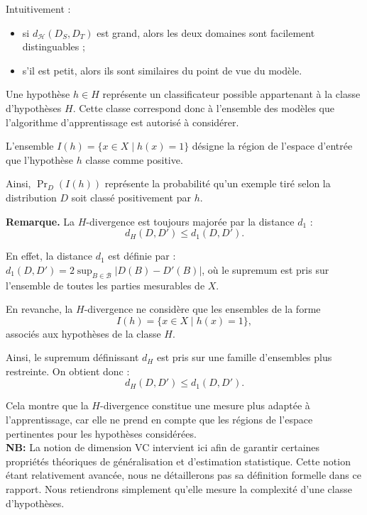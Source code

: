 \documentclass[a4paper,12pt]{article}
\theoremstyle{definition}
\theoremstyle{remark}
\begin{document}
Intuitivement :
\begin{itemize}
\item si $d_{\mathcal{H}}(D_S, D_T)$ est grand, alors les deux domaines sont facilement distinguables ;
\item s’il est petit, alors ils sont similaires du point de vue du modèle.\\
\end{itemize}



Une hypothèse $h \in H$ représente un classificateur possible appartenant à la classe
d’hypothèses $H$. Cette classe correspond donc à l’ensemble des modèles que l’algorithme
d’apprentissage est autorisé à considérer.

L’ensemble $I(h)=\{x \in X \mid h(x)=1\}$ désigne la région de l’espace d’entrée que l’hypothèse $h$ classe comme positive.

Ainsi, $\Pr_D(I(h))$ représente la probabilité qu’un exemple tiré selon la distribution $D$ soit classé positivement
par $h$.\\

\medskip

\textbf{Remarque.}
La $H$-divergence est toujours majorée par la distance $d_1$ :
\[
d_H(D,D')
\leq
d_1(D,D').
\]

En effet, la distance $d_1$ est définie par : $d_1(D,D') = 2\sup_{B\in\mathcal B}|D(B)-D'(B)|$,
où le supremum est pris sur l’ensemble de toutes les parties mesurables de $X$.

En revanche, la $H$-divergence ne considère que les ensembles de la forme
\[
I(h)=\{x\in X \mid h(x)=1\},
\]
associés aux hypothèses de la classe $H$.

Ainsi, le supremum définissant $d_H$ est pris sur une famille d’ensembles plus restreinte.
On obtient donc :
\[
d_H(D,D')
\leq
d_1(D,D').
\]

Cela montre que la $H$-divergence constitue une mesure plus adaptée à l’apprentissage,
car elle ne prend en compte que les régions de l’espace pertinentes pour les hypothèses
considérées.\\


\textbf{NB:} La notion de dimension VC intervient ici afin de garantir certaines propriétés théoriques
de généralisation et d’estimation statistique. Cette notion étant relativement avancée,
nous ne détaillerons pas sa définition formelle dans ce rapport. Nous retiendrons simplement
qu’elle mesure la complexité d’une classe d’hypothèses.\\ 
\end{document}
